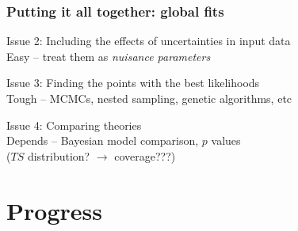 \documentclass[xcolor=dvipsnames]{beamer}
\newcommand{\cbluewhen}[2]{{\color#2[rgb]{0.1, 0.0, 0.6} #1}}
\begin{document}
\begin{frame}
\frametitle{Putting it all together: global fits}  

  \alert{Issue 2:} Including the effects of uncertainties in input data\\
  Easy -- treat them as \emph{nuisance parameters}\vspace{4mm}

  \alert{Issue 3:} Finding the points with the best likelihoods\\
  \cbluewhen{Tough -- MCMCs, nested sampling, genetic algorithms, etc}{<2>}\vspace{4mm}

  \alert{Issue 4:} Comparing theories\\
  \cbluewhen{Depends -- Bayesian model comparison, $p$ values\\
  \hspace{40mm}($TS$ distribution? $\longrightarrow$ coverage???)}{<2>} 

\end{frame}


\section{Progress}
\end{document}
